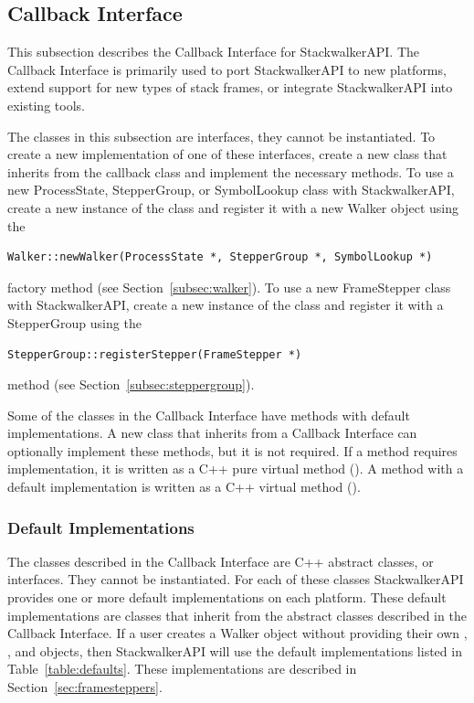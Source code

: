 \subsection{Callback Interface}
\label{sec:callback-interface}
This subsection describes the Callback Interface for StackwalkerAPI. The
Callback Interface is primarily used to port StackwalkerAPI to new platforms,
extend support for new types of stack frames, or integrate StackwalkerAPI into
existing tools.

The classes in this subsection are interfaces, they cannot be instantiated.  To
create a new implementation of one of these interfaces, create a new class that
inherits from the callback class and implement the necessary methods. To use a
new ProcessState, StepperGroup, or SymbolLookup class with StackwalkerAPI,
create a new instance of the class and register it with a new Walker object
using the
\begin{lstlisting}
Walker::newWalker(ProcessState *, StepperGroup *, SymbolLookup *)
\end{lstlisting}
factory method (see Section~\ref{subsec:walker}). To use a new FrameStepper class with
StackwalkerAPI, create a new instance of the class and register it with a
StepperGroup using the
\begin{lstlisting}
StepperGroup::registerStepper(FrameStepper *)
\end{lstlisting}
method (see Section~\ref{subsec:steppergroup}).

Some of the classes in the Callback Interface have methods with default
implementations. A new class that inherits from a Callback Interface can
optionally implement these methods, but it is not required. If a method requires
implementation, it is written as a C++ pure virtual method (). A method with a default implementation is written as a C++ virtual method
().

\subsubsection{Default Implementations}
\label{subsec:defaults}

The classes described in the Callback Interface are C++ abstract classes, or
interfaces. They cannot be instantiated. For each of these classes
StackwalkerAPI provides one or more default implementations on each platform.
These default implementations are classes that inherit from the abstract classes
described in the Callback Interface. If a user creates a Walker object without
providing their own , , and
 objects, then StackwalkerAPI will use the default
implementations listed in Table~\ref{table:defaults}. These
implementations are described in Section~\ref{sec:framesteppers}.

